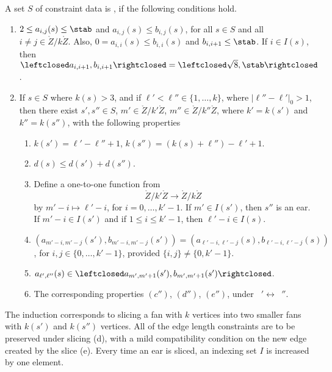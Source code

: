 \begin{definition}[coherence]
A set $S$ of constraint data is , if the following conditions
hold.
\begin{enumerate}
\item {} $2\le a_{i,j}(s)\le \stab$ and $a_{i,j}(s)\le
  b_{i,j}(s)$, for all $s\in S$ and all $i\ne j\in
  \ring{Z}/k\ring{Z}$.  Also, $0 = a_{i,i}(s)\le b_{i,i}(s)$ and
  $b_{i,i+1}\le \stab$.  If $i\in I(s)$, then $\leftclosed
  a_{i,i+1},b_{i,i+1}\rightclosed=\leftclosed\sqrt{8},\stab\rightclosed$.
\item {}
  If $s\in S$ where $k(s)>3$, and if  $\ell'<\ell''\in \{1,\ldots, k\}$, where
    $|\ell''-\ell'|_0 > 1$, then
 there exist $s',s''\in S$, $m'\in \ring{Z}/k'\ring{Z}$, $m''\in \ring{Z}/k''\ring{Z}$,
where $k'=k(s')$ and $k''=k(s'')$,
with the following
properties
\begin{enumerate}
\item  $k(s') = \ell' - \ell'' +1$,
  $k(s'') = (k(s)+\ell'')  - \ell' + 1$.
\item $d(s) \le d(s') + d(s'')$.
\item Define a one-to-one function from 
  \begin{equation}\label{eqn:injk'}
  \ring{Z}/k'\ring{Z}\to \ring{Z}/k\ring{Z}
   \end{equation}
 by $m'-i \mapsto \ell'-i$, for $i=0,\ldots,k'-1$.
If $m'\in I(s')$, then $s''$ is an ear.   If
$m'-i\in I(s')$ and if $1\le i\le k'-1$, then $\ell'-i\in I(s)$.
\item $(a_{m'-i,m'-j}(s'),b_{m'-i,m'-j}(s'))=(a_{\ell'-i,\ell'-j}(s),b_{\ell'-i,\ell'-j}(s))$,
  for $i,j\in \{0,\ldots,k'-1\}$, provided $\{i,j\}\ne \{0,k'-1\}$.
\item $a_{\ell',\ell''}(s) \in \leftclosed a_{m',m'+1}(s'),b_{m',m'+1}(s')\rightclosed$.
\item The corresponding properties $(c'')$, $(d'')$, $(e'')$, 
under $\phantom{a}'\leftrightarrow \phantom{a}''$.
\end{enumerate}
\end{enumerate}
\end{definition}

The induction corresponds to slicing a fan with $k$ vertices into
two smaller fans with $k(s')$ and $k(s'')$ vertices.  All of the edge
length constraints are to be preserved under slicing (d), with a
mild compatibility condition on the new edge created by the slice (e).
Every time an ear is sliced, an indexing set $I$ is increased by one
element.

